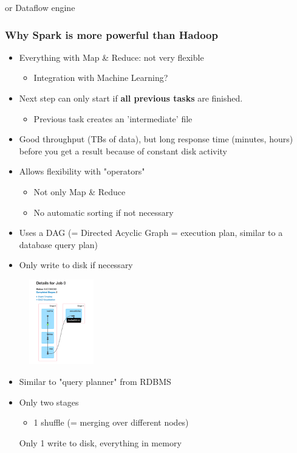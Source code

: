 \documentclass{article}
\begin{document}
or Dataflow engine

\subsubsection{Why Spark is more powerful than Hadoop}

\begin{itemize}
    \item Everything with Map \& Reduce: not very flexible
    \begin{itemize}
        \item Integration with Machine Learning?
    \end{itemize}
    \item Next step can only start if \textbf{all previous tasks} are finished. 
    \begin{itemize}
        \item Previous task creates an 'intermediate' file
    \end{itemize}
    \item Good throughput (TBs of data), but long response time (minutes, hours) before you get a result because of constant disk activity
    \item Allows flexibility with "operators"
    \begin{itemize}
        \item Not only Map \& Reduce
        \item No automatic sorting if not necessary
    \end{itemize}
    \item Uses a DAG (= Directed Acyclic Graph = execution plan, similar to a database query plan)
    \item Only write to disk if necessary
\end{itemize}

\begin{figure}[H]
    \centering
    \includegraphics[width=0.25\textwidth]{spark.png}
    \caption{}
\end{figure}

\begin{itemize}
    \item Similar to "query planner" from RDBMS
    \item Only two stages
    \begin{itemize}
        \item 1 shuffle (= merging over different nodes)
    \end{itemize}
    Only 1 write to disk, everything in memory
\end{itemize}
\end{document}
